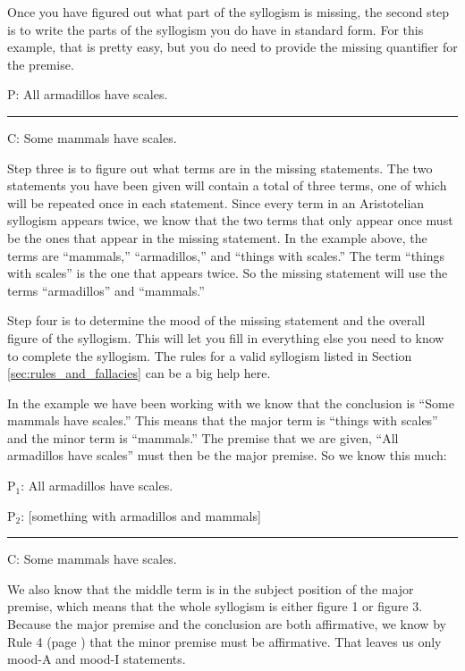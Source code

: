 Once you have figured out what part of the syllogism is missing, the second step is to write the parts of the syllogism you do have in standard form. For this example, that is pretty easy, but you do need to provide the missing quantifier for the premise.

\begin{earg}
\item[P:] All armadillos have scales.
\vspace{-.5em}
\item [] \rule{0.3\linewidth}{.5pt} 
\item[C:] Some mammals have scales. 
\end{earg}

 Step three is to figure out what terms are in the missing statements. The two statements you have been given will contain a total of three terms, one of which will be repeated once in each statement. Since every term in an Aristotelian syllogism appears twice, we know that the two terms that only appear once must be the ones that appear in the missing statement. In the example above, the terms are ``mammals,'' ``armadillos,'' and ``things with scales.'' The term ``things with scales'' is the one that appears twice. So the missing statement will use the terms ``armadillos'' and ``mammals.''
   
Step four is to determine the mood of the missing statement and the overall figure of the syllogism. This will let you fill in everything else you need to know to complete the syllogism. The rules for a valid syllogism listed in Section \ref{sec:rules_and_fallacies} can be a big help here.

In the example we have been working with we know that the conclusion is ``Some mammals have scales.'' This means that the major term is ``things with scales'' and the minor term is ``mammals.'' The premise that we are given, ``All armadillos have scales'' must then be the major premise. So we know this much:

\begin{earg}
\item[P$_1$:] All armadillos have scales.
\item[P$_2$:] [something with armadillos and mammals]
\vspace{-.5em}
\item [] \rule{0.6\linewidth}{.5pt} 
\item[C:] Some mammals have scales. 
\end{earg}

We also know that the middle term is in the subject position of the major premise, which means that the whole syllogism is either figure 1 or figure 3. Because the major premise and the conclusion are both affirmative, we know by Rule 4 (page \pageref{rule4}) that the minor premise must be affirmative. That leaves us only mood-A and mood-I statements. \label{rule_use}

